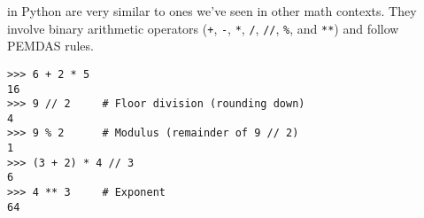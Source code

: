  in Python are very similar to ones we've seen
in other math contexts. They involve binary arithmetic operators (\texttt{+},
\texttt{-}, \texttt{*}, \texttt{/}, \texttt{//}, \texttt{\%}, and \texttt{**})
and follow PEMDAS rules.

\begin{lstlisting}
>>> 6 + 2 * 5
16
>>> 9 // 2     # Floor division (rounding down)
4
>>> 9 % 2      # Modulus (remainder of 9 // 2)
1
>>> (3 + 2) * 4 // 3
6
>>> 4 ** 3     # Exponent
64
\end{lstlisting}
